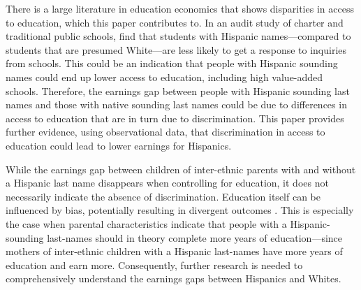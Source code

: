 There is a large literature in education economics that shows disparities in access to education, which this paper contributes to. In an audit study of charter and traditional public schools, \textcite{bergman2018education,gaddis2024racial} find that students with Hispanic names---compared to students that are presumed White---are less likely to get a response to inquiries from schools. This could be an indication that people with Hispanic sounding names could end up lower access to education, including high value-added schools. Therefore, the earnings gap between people with Hispanic sounding last names and those with native sounding last names could be due to differences in access to education that are in turn due to discrimination. This paper provides further evidence, using observational data, that discrimination in access to education could lead to lower earnings for Hispanics. 

While the earnings gap between children of inter-ethnic parents with and without a Hispanic last name disappears when controlling for education, it does not necessarily indicate the absence of discrimination. Education itself can be influenced by bias, potentially resulting in divergent outcomes \autocite{bergman2018education,gaddis2024racial}. This is especially the case when parental characteristics indicate that people with a Hispanic-sounding last-names should in theory complete more years of education---since mothers of inter-ethnic children with a Hispanic last-names have more years of education and earn more. Consequently, further research is needed to comprehensively understand the earnings gaps between Hispanics and Whites.